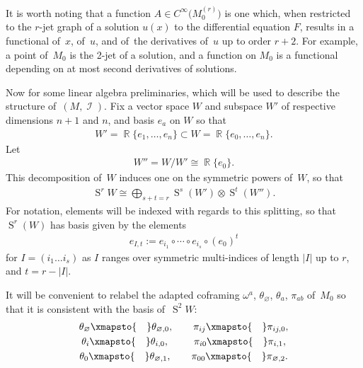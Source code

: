 \documentclass[10pt,a4paper]{amsart}
\DeclareMathOperator{\R}{\mathbb{R}}
\DeclareMathOperator{\Sym}{S}
\DeclareMathOperator{\I}{\mathcal{I}}
\newcommand{\cinfinity}[1]{C^\infty\big(#1\big)}
\newcommand{\M}[1]{M_0^{(#1)}}
\newcommand{\thetas}[1]{\theta_{#1}}
\newcommand{\pis}[1]{\pi_{#1}}
\numberwithin{equation}{section}
\begin{document}
It is worth noting that a function $A \in \cinfinity{\M{r}}$ is one which, when restricted to the $r$-jet graph of a solution $u(x)$ to the differential equation $F$, results in a functional of~$x$, of~$u$, and of~the derivatives of~$u$ up to order $r+2$. For example, a point of~$M_0$ is the 2-jet of a solution, and a function on $M_0$ is a functional depending on at most second derivatives of solutions.

Now for some linear algebra preliminaries, which will be used to describe the structure of~$(M,\I)$. Fix a vector space $W$ and subspace $W'$ of respective dimensions $n+1$ and $n$, and basis $e_a$ on $W$ so that
\begin{gather*}
W' = \R\{e_1 , \dots , e_n\} \subset W = \R\{e_0 , \dots , e_n\} .
\end{gather*}
Let
\begin{gather*}
W'' = W/W' \cong \R\{e_0\} .
\end{gather*}
This decomposition of~$W$ induces one on the symmetric powers of~$W$, so that
\begin{gather*}
\Sym^{r} W \cong \bigoplus_{s+t= r} \Sym^s( W') \otimes \Sym^t( W'') .
\end{gather*}
For notation, elements will be indexed with regards to this splitting, so that $\Sym^r(W)$ has basis given by the elements
\begin{gather*}
e_{I,t} := e_{i_1}{\circ}\cdots{\circ}e_{i_s}{\circ}(e_0)^{t}
\end{gather*}
for $I = (i_1\dots i_s)$ as $I$ ranges over symmetric multi-indices of length $|I|$ up to $r$, and $t = r -|I|$.

It will be convenient to relabel the adapted coframing $\omega^a$, $\thetas{\varnothing}$, $\thetas{a}$, $\pis{ab}$ of~$M_0$
so that it is consistent with the basis of~$\Sym^2 W$:
\begin{gather*}
 \thetas{\varnothing} \xmapsto{\quad} \thetas{\varnothing,0}, \qquad \pis{ij} \xmapsto{\quad} \pis{ij,0},
 \\
 \thetas{i} \xmapsto{\quad} \thetas{i,0},\qquad \ \,\pis{i0} \xmapsto{\quad} \pis{i,1},
 \\
 \thetas{0} \xmapsto{\quad} \thetas{\varnothing,1},\qquad \pis{00} \xmapsto{\quad} \pis{\varnothing, 2}.
\end{gather*}
\end{document}
